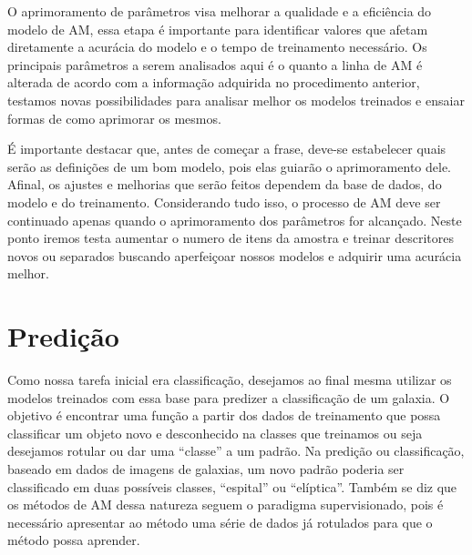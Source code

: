 O aprimoramento de parâmetros visa melhorar a qualidade e a eficiência do modelo de AM, essa etapa é importante para identificar valores que afetam diretamente a acurácia do modelo e o tempo de treinamento necessário. Os principais parâmetros a serem analisados aqui é o quanto a linha de AM é alterada de acordo com a informação adquirida no procedimento anterior, testamos novas possibilidades para analisar melhor os modelos treinados e ensaiar formas de como aprimorar os mesmos. 

É importante destacar que, antes de começar a frase, deve-se estabelecer quais serão as definições de um bom modelo, pois elas guiarão o aprimoramento dele. Afinal, os ajustes e melhorias que serão feitos dependem da base de dados, do modelo e do treinamento. Considerando tudo isso, o processo de AM deve ser continuado apenas quando o aprimoramento dos parâmetros for alcançado. Neste ponto iremos testa aumentar o numero de itens da amostra e treinar descritores novos ou separados buscando aperfeiçoar nossos modelos e adquirir uma acurácia melhor.

\section{Predição}

Como nossa tarefa inicial era classificação, desejamos ao final mesma utilizar os modelos treinados com essa base para predizer a classificação de um galaxia. O objetivo é encontrar uma função a partir dos dados de treinamento que possa classificar um objeto novo e desconhecido na classes que treinamos ou seja desejamos rotular ou dar uma “classe” a um padrão. Na predição ou classificação, baseado em dados de imagens de galaxias, um novo padrão poderia ser classificado em duas possíveis classes, “espital” ou “elíptica”. Também se diz que os métodos de AM dessa natureza seguem o paradigma supervisionado, pois é necessário apresentar ao método uma série de dados já rotulados para que o método possa aprender.

